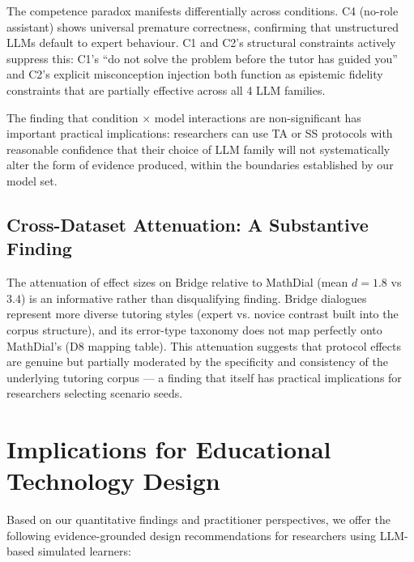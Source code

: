\documentclass[12pt]{article}
\begin{document}
The competence paradox \citep{yuan2026} manifests differentially across conditions.
C4 (no-role assistant) shows universal premature correctness, confirming that unstructured
LLMs default to expert behaviour. C1 and C2's structural constraints actively suppress
this: C1's ``do not solve the problem before the tutor has guided you'' and C2's explicit
misconception injection both function as epistemic fidelity constraints that are partially
effective across all 4 LLM families.

The finding that condition $\times$ model interactions are non-significant has important
practical implications: researchers can use TA or SS protocols with reasonable confidence
that their choice of LLM family will not systematically alter the form of evidence produced,
within the boundaries established by our model set.

\subsection{Cross-Dataset Attenuation: A Substantive Finding}

The attenuation of effect sizes on Bridge relative to MathDial (mean $d = 1.8$ vs $3.4$)
is an informative rather than disqualifying finding. Bridge dialogues represent more
diverse tutoring styles (expert vs. novice contrast built into the corpus structure),
and its error-type taxonomy does not map perfectly onto MathDial's (D8 mapping table).
This attenuation suggests that protocol effects are genuine but partially moderated by
the specificity and consistency of the underlying tutoring corpus --- a finding that
itself has practical implications for researchers selecting scenario seeds.

\section{Implications for Educational Technology Design}

Based on our quantitative findings and practitioner perspectives, we offer the following
evidence-grounded design recommendations for researchers using LLM-based simulated learners:
\end{document}
